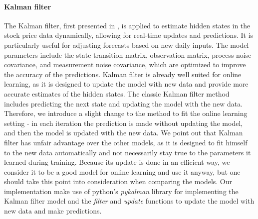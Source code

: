 \documentclass[12pt]{article}
\theoremstyle{definition}
\begin{document}
\paragraph{Kalman filter}
The Kalman filter, first presented in \cite{kalman1960new}, is applied to estimate hidden states in the stock price data dynamically, allowing for real-time updates and predictions. 
It is particularly useful for adjusting forecasts based on new daily inputs.
The model parameters include the state transition matrix, observation matrix, process noise covariance, and measurement noise covariance, which are optimized to improve the accuracy of the predictions.
Kalman filter is already well suited for online learning, as it is designed to update the model with new data and provide more accurate estimates of the hidden states.
The classic Kalman filter method includes predicting the next state and updating the model with the new data.
Therefore, we introduce a slight change to the method to fit the online learning setting - in each iteration the prediction is made without updating the model, and then the model is updated with the new data.
We point out that Kalman filter has unfair advantage over the other models, as it is designed to fit himself to the new data automatically and not necessarily stay true to the parameters it learned during training.
Because its update is done in an efficient way, we consider it to be a good model for online learning and use it anyway, but one should take this point into consideration when comparing the models.
Our implementation make use of python's \textit{pykalman} library for implementing the Kalman filter model and the \textit{filter} and \textit{update} functions to update the model with new data and make predictions.
\end{document}

